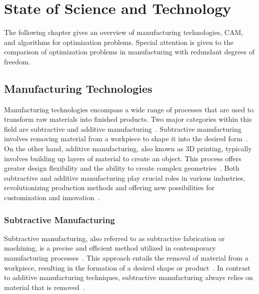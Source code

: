 \chapter{State of Science and Technology}\label{SST}
The following chapter gives an overview of manufacturing technologies, CAM, and algorithms for optimization problems. Special attention is given to the comparison of optimization problems in manufacturing with redundant degrees of freedom. 


\section{Manufacturing Technologies}
Manufacturing technologies encompass a wide range of processes that are used to transform raw materials into finished products. Two major categories within this field are subtractive and additive manufacturing~\cite{Iqbal.2020}. Subtractive manufacturing involves removing material from a workpiece to shape it into the desired form~\cite{Watson.2015}. %
On the other hand, additive manufacturing, also known as 3D printing, typically involves building up layers of material to create an object. This process offers greater design flexibility and the ability to create complex geometries~\cite{Dilberoglu.2017}. Both subtractive and additive manufacturing play crucial roles in various industries, revolutionizing production methods and offering new possibilities for customization and innovation~\cite{Bandyopadhyay.2020, vanLe.2017}.











\subsection{Subtractive Manufacturing}
Subtractive manufacturing, also referred to as subtractive fabrication or machining, is a precise and efficient method utilized in contemporary manufacturing processes~\cite{Wang.2023}. This approach entails the removal of material from a workpiece, resulting in the formation of a desired shape or product~\cite{Calleja.2018}. In contrast to additive manufacturing techniques, subtractive manufacturing always relies on material that is removed~\cite{Abdulhameed.2019}.


